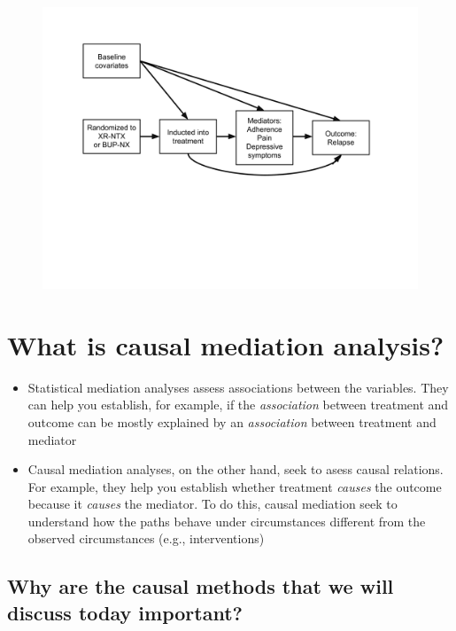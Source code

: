 \documentclass[
  12pt,
]{book}
\providecommand{\tightlist}{%
  \setlength{\itemsep}{0pt}\setlength{\parskip}{0pt}}
\theoremstyle{definition}
\theoremstyle{definition}
\theoremstyle{definition}
\newcommand{\1}{\mathbbm{1}}
\begin{document}
\begin{figure}

{\centering \includegraphics[width=1\linewidth]{img/ctndag} 

}

\end{figure}

\hypertarget{what-is-causal-mediation-analysis}{%
\section{What is causal mediation analysis?}\label{what-is-causal-mediation-analysis}}

\begin{itemize}
\tightlist
\item
  Statistical mediation analyses assess associations between the
  variables. They can help you establish, for example, if the
  \emph{association} between treatment and outcome can be mostly explained
  by an \emph{association} between treatment and mediator
\item
  Causal mediation analyses, on the other hand, seek to asess causal
  relations. For example, they help you establish whether treatment
  \emph{causes} the outcome because it \emph{causes} the mediator. To do this,
  causal mediation seek to understand how the
  paths behave under circumstances different from the observed
  circumstances (e.g., interventions)
\end{itemize}

\hypertarget{why-are-the-causal-methods-that-we-will-discuss-today-important}{%
\subsection{Why are the causal methods that we will discuss today important?}\label{why-are-the-causal-methods-that-we-will-discuss-today-important}}
\end{document}
